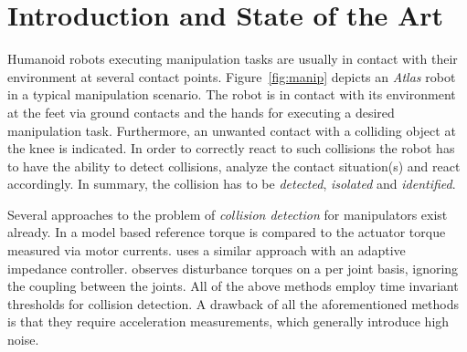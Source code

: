 \section{Introduction and State of the Art}

Humanoid robots executing manipulation tasks are usually in contact with their environment at several contact points.
Figure~\ref{fig:manip} depicts an \emph{{A}tlas} robot in a typical manipulation scenario. The robot is in contact with its environment at the feet via ground contacts and the hands for executing a desired manipulation task. Furthermore, an unwanted contact with a colliding object at the knee is indicated. 
In order to correctly react to such collisions the robot has to have the ability to detect collisions, analyze the contact situation(s) and react accordingly. 
In summary, the collision has to be \emph{detected}, \emph{isolated} and \emph{identified}.

Several approaches to the problem of \emph{collision detection} for manipulators exist already. 
In \cite{YamadaHirHuaUme1997,SuitaYamTsuIma1995} a model based reference torque is compared to the actuator torque measured via motor currents. 
\cite{MorinagaKos2003} uses a similar approach with an adaptive impedance controller. \cite{TakakuraMurOhn1989} observes disturbance torques on a per joint basis, ignoring the coupling between the joints. All of the above methods employ time invariant thresholds for collision detection.
A drawback of all the aforementioned methods is that they require acceleration measurements, which generally introduce high noise.


